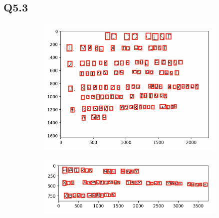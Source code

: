\documentclass{article}
\begin{document}
\subsection*{Q5.3}
\begin{figure}
    \centering
    \begin{subfigure}[h]{0.4\textwidth}
        \includegraphics[width=\textwidth]{box1.png}
    \end{subfigure}
    \hfill
    \begin{subfigure}[h]{0.4\textwidth}
        \includegraphics[width=\textwidth]{box2.png}
    \end{subfigure}
\end{figure}
\end{document}
